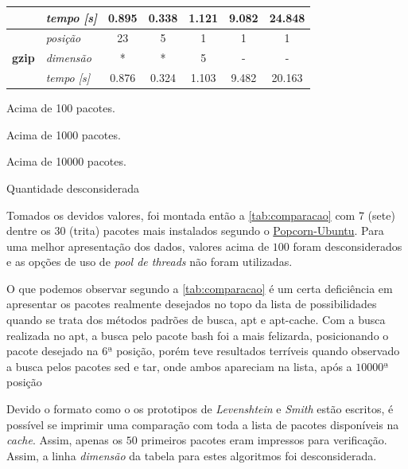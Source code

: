\begin{table}[htbp]
{\begin{tabular}[c]{|c|l|c|c|c|c|c|}
\multicolumn{ 1}{|c|}{} & \textit{tempo [s]} & 0.895 & 0.338 & 1.121 & 9.082 & 24.848 \\ \hline
\multicolumn{ 1}{|c|}{} & \textit{posição} & 23 & 5 & 1 & 1 & 1 \\ \cline{ 2- 7}
\multicolumn{ 1}{|c|}{\textbf{gzip}} & \textit{dimensão} & * & * & 5 & - & - \\ \cline{ 2- 7}
\multicolumn{ 1}{|c|}{} & \textit{tempo [s]} & 0.876 & 0.324 & 1.103 & 9.482 & 20.163 \\ \hline
\end{tabular}
}
\label{tab:comparacao}
\begin{description}
	\tiny
	\item [Legenda]
	\item [*] Acima de 100 pacotes.
	\item [**] Acima de 1000 pacotes.
	\item [***] Acima de 10000 pacotes.
	\item [$-$] Quantidade desconsiderada
\end{description}

\end{table}


Tomados os devidos valores, foi montada então a \autoref{tab:comparacao} com 7 (sete) dentre os 30 (trita) pacotes mais instalados segundo o \href{http://popcon.ubuntu.com/}{Popcorn-Ubuntu}. Para uma melhor apresentação dos dados, valores acima de $100$ foram desconsiderados e as opções de uso de \textit{pool de threads} não foram utilizadas.

O que  podemos observar  segundo a \autoref{tab:comparacao} é um certa deficiência em apresentar os pacotes realmente desejados no topo da lista de possibilidades quando se trata dos métodos padrões de busca, {\code apt} e {\code apt-cache}. Com a busca realizada no {\code apt}, a busca pelo pacote {\code bash} foi a mais felizarda, posicionando o pacote desejado na $6ª$ posição, porém teve resultados terríveis quando observado a busca pelos pacotes {\code sed} e {\code tar}, onde ambos apareciam na lista, após a $10000ª$ posição


Devido o formato como o os prototipos de \textit{Levenshtein} e \textit{Smith} estão escritos, é possível se imprimir uma comparação com toda a lista de pacotes disponíveis na \textit{cache}. Assim, apenas os $50$ primeiros pacotes eram impressos para verificação. Assim, a linha \textit{dimensão} da tabela para estes algoritmos foi desconsiderada.

